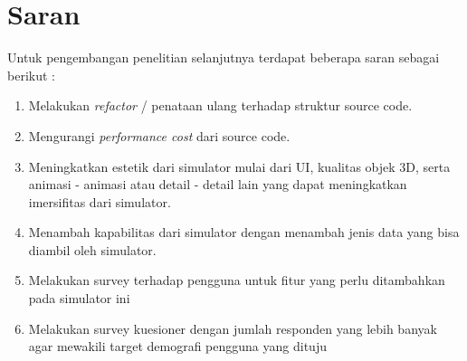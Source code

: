 \section{Saran}
\vspace{1ex}

Untuk pengembangan penelitian selanjutnya terdapat beberapa saran sebagai berikut :
\vspace{1ex}

\begin{enumerate}[nolistsep]
	
	\item Melakukan \textit{refactor} / penataan ulang terhadap struktur source code.
	\vspace{1ex}
	
	\item Mengurangi \textit{performance cost} dari source code.
	\vspace{1ex}
	
	\item Meningkatkan estetik dari simulator mulai dari UI, kualitas objek 3D, serta animasi - animasi atau detail - detail  lain yang dapat meningkatkan imersifitas dari simulator.
	
	\item Menambah kapabilitas dari simulator dengan menambah jenis data yang bisa diambil oleh simulator.
	\vspace{1ex}

    \item Melakukan survey terhadap pengguna untuk fitur yang perlu ditambahkan pada simulator ini
	\vspace{1ex}
	
	\item Melakukan survey kuesioner dengan jumlah responden yang lebih banyak agar mewakili target demografi pengguna yang dituju
	\vspace{1ex}

\end{enumerate}